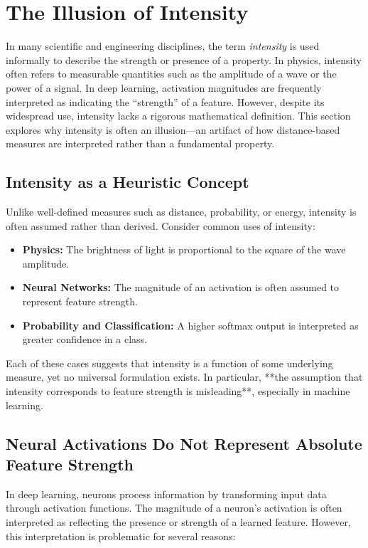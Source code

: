 \section{The Illusion of Intensity}

In many scientific and engineering disciplines, the term \textit{intensity} is used informally to describe the strength or presence of a property. In physics, intensity often refers to measurable quantities such as the amplitude of a wave or the power of a signal. In deep learning, activation magnitudes are frequently interpreted as indicating the “strength” of a feature. However, despite its widespread use, intensity lacks a rigorous mathematical definition. This section explores why intensity is often an illusion—an artifact of how distance-based measures are interpreted rather than a fundamental property.

\subsection{Intensity as a Heuristic Concept}

Unlike well-defined measures such as distance, probability, or energy, intensity is often assumed rather than derived. Consider common uses of intensity:

\begin{itemize}
    \item \textbf{Physics:} The brightness of light is proportional to the square of the wave amplitude.
    \item \textbf{Neural Networks:} The magnitude of an activation is often assumed to represent feature strength.
    \item \textbf{Probability and Classification:} A higher softmax output is interpreted as greater confidence in a class.
\end{itemize}

Each of these cases suggests that intensity is a function of some underlying measure, yet no universal formulation exists. In particular, **the assumption that intensity corresponds to feature strength is misleading**, especially in machine learning.

\subsection{Neural Activations Do Not Represent Absolute Feature Strength}

In deep learning, neurons process information by transforming input data through activation functions. The magnitude of a neuron’s activation is often interpreted as reflecting the presence or strength of a learned feature. However, this interpretation is problematic for several reasons:

